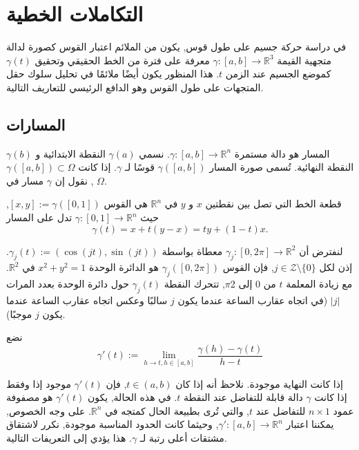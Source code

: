 \chapter{التكاملات الخطية}

في دراسة حركة جسيم على طول قوس, يكون من الملائم اعتبار القوس كصورة لدالة متجهية القيمة \( \gamma : [a, b] \to \mathbb{R}^3 \) معرفة على فترة من الخط الحقيقي وتحقيق \( \gamma(t) \) كموضع الجسيم عند الزمن \( t \). هذا المنظور يكون أيضًا ملائمًا في تحليل سلوك حقل المتجهات على طول القوس وهو الدافع الرئيسي للتعاريف التالية.

\section{ المسارات}

\begin{definition}
المسار هو دالة مستمرة \( \gamma : [a, b] \to \mathbb{R}^n \). نسمي \( \gamma(a) \) النقطة الابتدائية و \( \gamma(b) \) النقطة النهائية. تُسمى صورة المسار \( \gamma([a, b]) \) قوسًا لـ \( \gamma \). إذا كانت \( \gamma([a, b]) \subset \Omega \), نقول إن \( \gamma \) مسار في \( \Omega \).
\end{definition}

\begin{exemple}
قطعة الخط التي تصل بين نقطتين \( x \) و \( y \) في \( \mathbb{R}^n \) هي القوس \([x, y] := \gamma([0, 1])\), حيث \( \gamma : [0, 1] \to \mathbb{R}^n \) تدل على المسار
\[ \gamma(t) = x + t(y - x) = ty + (1 - t)x. \]
\end{exemple}

\begin{exemple}
لنفترض أن \( \gamma_j : [0, 2\pi] \to \mathbb{R}^2 \) معطاة بواسطة \( \gamma_j(t) := (\cos(jt), \sin(jt)) \). إذن لكل \( j \in \mathcal{Z} \setminus \{0\} \), فإن القوس \( \gamma_j([0, 2\pi]) \) هو الدائرة الوحدة \( x^2 + y^2 = 1 \) في \( \mathbb{R}^2 \). مع زيادة المعلمة \( t \) من 0 إلى 2\(\pi\), تتحرك النقطة \( \gamma_j(t) \) حول دائرة الوحدة بعدد المرات \( |j| \) (في اتجاه عقارب الساعة عندما يكون \( j \) سالبًا وعكس اتجاه عقارب الساعة عندما يكون \( j \) موجبًا).
\end{exemple}
نضع 
\[
\gamma'(t) := \lim_{h \to t, h \in [a, b]} \frac{\gamma(h) - \gamma(t)}{h - t} 
\]

إذا كانت النهاية موجودة. نلاحظ أنه إذا كان \( t \in (a, b) \), فإن \( \gamma'(t) \) موجود إذا وفقط إذا كانت \( \gamma \) دالة قابلة للتفاضل عند النقطة \( t \). في هذه الحالة, يكون \( \gamma'(t) \) هو مصفوفة عمود \( n \times 1 \) للتفاضل عند \( t \), والتي تُرى بطبيعة الحال كمتجه في \( \mathbb{R}^n \). على وجه الخصوص, يمكننا اعتبار \( \gamma' : [a, b] \to \mathbb{R}^n \), وحيثما كانت الحدود المناسبة موجودة, نكرر لاشتقاق مشتقات أعلى رتبة لـ \( \gamma \). هذا يؤدي إلى التعريفات التالية.

